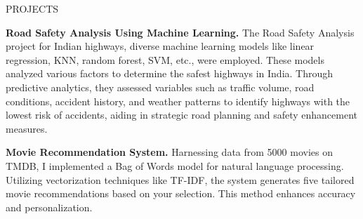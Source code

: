 \documentclass{resume} %
\begin{document}
\begin{rSection}{PROJECTS}
\vspace{-1.25em}
\item \textbf{Road Safety Analysis Using Machine Learning.} {The Road Safety Analysis project for Indian highways, diverse machine learning models like linear regression, KNN, random forest, SVM, etc., were employed. These models analyzed various factors to determine the safest highways in India. Through predictive analytics, they assessed variables such as traffic volume, road conditions, accident history, and weather patterns to identify highways with the lowest risk of accidents, aiding in strategic road planning and safety enhancement measures.}
\item \textbf{Movie Recommendation System.} {Harnessing data from 5000 movies on TMDB, I implemented a Bag of Words model for natural language processing. Utilizing vectorization techniques like TF-IDF, the system generates five tailored movie recommendations based on your selection. This method enhances accuracy and personalization.}
\end{rSection} 
\end{document}
